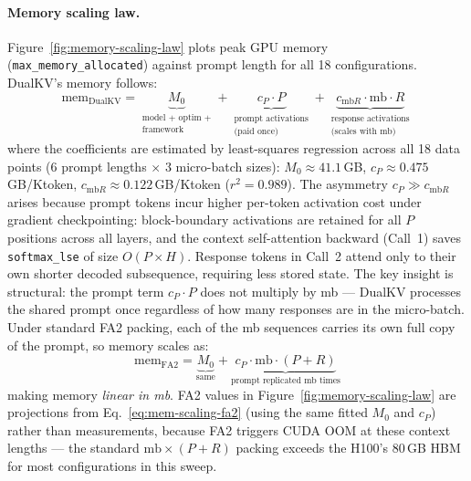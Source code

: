 \documentclass{article}
\begin{document}
\paragraph{Memory scaling law.} Figure~\ref{fig:memory-scaling-law} plots peak GPU memory (\texttt{max\_memory\_allocated}) against prompt length for all 18 configurations. DualKV's memory follows:
\begin{equation}
  \text{mem}_{\text{DualKV}} = \underbrace{M_0}_{\substack{\text{model + optim +}\\\text{framework}}} + \underbrace{c_P \cdot P}_{\substack{\text{prompt activations}\\\text{(paid once)}}} + \underbrace{c_{\text{mb}R} \cdot \text{mb} \cdot R}_{\substack{\text{response activations}\\\text{(scales with mb)}}}
  \label{eq:mem-scaling}
\end{equation}
where the coefficients are estimated by least-squares regression across all 18 data points ($6$ prompt lengths $\times$ $3$ micro-batch sizes): $M_0 \approx 41.1$\,GB, $c_P \approx 0.475$\,GB/Ktoken, $c_{\text{mb}R} \approx 0.122$\,GB/Ktoken ($r^2 = 0.989$). The asymmetry $c_P \gg c_{\text{mb}R}$ arises because prompt tokens incur higher per-token activation cost under gradient checkpointing: block-boundary activations are retained for all $P$ positions across all layers, and the context self-attention backward (Call~1) saves \texttt{softmax\_lse} of size $O(P \times H)$. Response tokens in Call~2 attend only to their own shorter decoded subsequence, requiring less stored state. The key insight is structural: the prompt term $c_P \cdot P$ does not multiply by mb --- DualKV processes the shared prompt once regardless of how many responses are in the micro-batch. Under standard FA2 packing, each of the mb sequences carries its own full copy of the prompt, so memory scales as:
\begin{equation}
  \text{mem}_{\text{FA2}} = \underbrace{M_0}_{\text{same}} + \underbrace{c_P \cdot \text{mb} \cdot (P + R)}_{\text{prompt replicated mb times}}
  \label{eq:mem-scaling-fa2}
\end{equation}
making memory \emph{linear in mb}. FA2 values in Figure~\ref{fig:memory-scaling-law} are projections from Eq.~\ref{eq:mem-scaling-fa2} (using the same fitted $M_0$ and $c_P$) rather than measurements, because FA2 triggers CUDA OOM at these context lengths --- the standard $\text{mb} \times (P + R)$ packing exceeds the H100's 80\,GB HBM for most configurations in this sweep.
\end{document}
